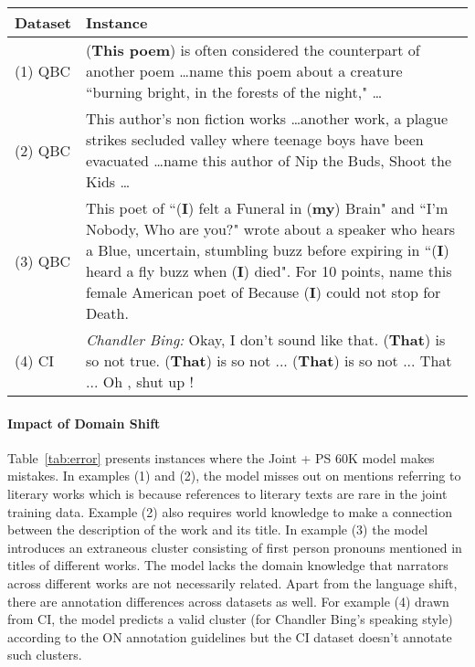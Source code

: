 \documentclass[12pt]{thesis-umich}[thesis]
\begin{document}
\begin{table*}
		\setlength{\tabcolsep}{0pt}

	\begin{tabular}{p{}p{}}
	\toprule
	Dataset & Instance \\
	\midrule
	(1) QBC & (\colorbox{blue!30}{\textbf{This poem}}) is often considered \colorbox{blue!30}{the counterpart of another poem} \dots name \colorbox{blue!30}{this poem about a creature ``burning bright, in the forests of the night,"} \dots\\\midrule
	(2) QBC & This author's non fiction works \dots \colorbox{blue!30}{another work}, a plague strikes secluded valley where teenage boys have been evacuated \dots name this author of \colorbox{blue!30}{Nip the Buds, Shoot the Kids}
	\dots\\\midrule

	(3) QBC & This poet of ``(\textbf{I}) felt a Funeral in (\textbf{my}) Brain" and ``I'm Nobody, Who are you?"  wrote about a speaker who hears a Blue, uncertain, stumbling buzz before expiring in ``(\textbf{I}) heard a fly buzz when (\textbf{I}) died". For 10 points, name this female American poet of Because (\textbf{I}) could not stop for Death.\\\midrule
		(4) CI & \textit{Chandler Bing:} Okay, I don't sound like that. (\textbf{That}) is so not true. (\textbf{That}) is so not ... (\textbf{That}) is so not ... That ... Oh , shut up !\\
	\bottomrule
	\end{tabular}
\caption{Joint + PS 60K error analysis for zero-shot evaluation sets. Each row highlights one cluster where spans in parenthesis are predicted by the model while the blue-colored spans represent ground truth annotations. Thus, in (2) the model misses out on the ground truth cluster entirely while in  (3) and (4) the model predicts an additional cluster.
}

\label{tab:error}
\end{table*}
 

\paragraph{Impact of Domain Shift}
Table~\ref{tab:error} presents instances where the Joint + PS 60K model makes mistakes. 
In examples (1) and (2), the model misses out on mentions referring to literary works which is because references to literary texts are rare in the joint training data. 
Example (2) also requires world knowledge to make a connection between the description of the work and its title. 
In example (3) the model introduces an extraneous cluster consisting of first person pronouns mentioned in titles of different works. The model lacks the domain knowledge that narrators across different works are not necessarily related.  
Apart from the language shift, there are annotation differences across datasets as well. For example (4) drawn from CI, the model predicts a valid cluster (for Chandler Bing's speaking style) according to the ON annotation guidelines but the CI dataset doesn't annotate such clusters.   
\end{document}
